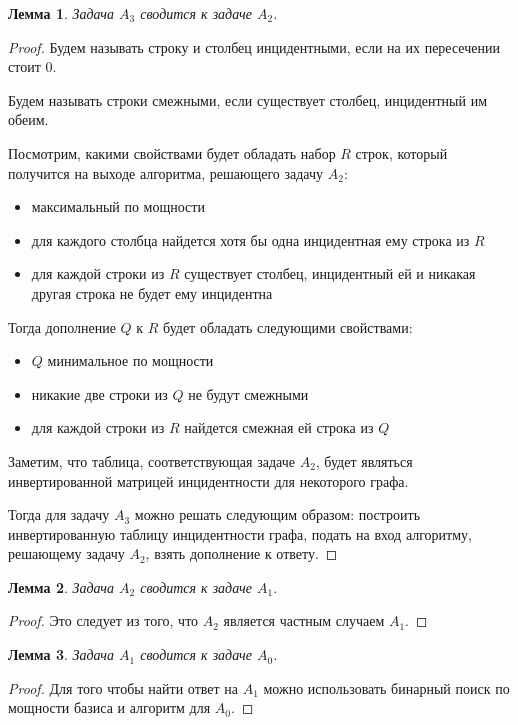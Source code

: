 \documentclass[a4paper,14pt]{extreport}
\newtheorem{lm}{Лемма}
\begin{document}
\begin{lm}
Задача $A_3$ сводится к задаче $A_2$.
\end{lm}
\begin{proof}
Будем называть строку и столбец инцидентными, если на их пересечении стоит 0. 

Будем называть строки смежными, если существует столбец, инцидентный им обеим.

Посмотрим, какими свойствами будет обладать набор $R$ строк, который получится на выходе алгоритма, решающего задачу $A_2$:
\begin{itemize}
\item максимальный по мощности    
\item для каждого столбца найдется хотя бы одна инцидентная ему строка из $R$
\item для каждой строки из $R$ существует столбец, инцидентный ей и никакая другая строка не будет ему инцидентна     
\end{itemize}

Тогда дополнение $Q$ к $R$ будет обладать следующими свойствами:
\begin{itemize}
\item $Q$ минимальное по мощности    
\item никакие две строки из $Q$ не будут смежными
\item для каждой строки из $R$ найдется смежная ей строка из $Q$     
\end{itemize}

Заметим, что таблица, соответствующая задаче $A_2$, будет являться инвертированной матрицей инцидентности для некоторого графа.

Тогда для задачу $A_3$ можно решать следующим образом: построить инвертированную таблицу инцидентности графа, подать на вход алгоритму, решающему задачу $A_2$, взять дополнение к ответу.
\end{proof}

\begin{lm}
Задача $A_2$ сводится к задаче $A_1$.
\end{lm}
\begin{proof}
Это следует из того, что $A_2$ является частным случаем $A_1$.
\end{proof}

\begin{lm}
Задача $A_1$ сводится к задаче $A_0$.
\end{lm}
\begin{proof}
Для того чтобы найти ответ на $A_1$ можно использовать бинарный поиск по мощности базиса и алгоритм для $A_0$.
\end{proof}
\end{document}
